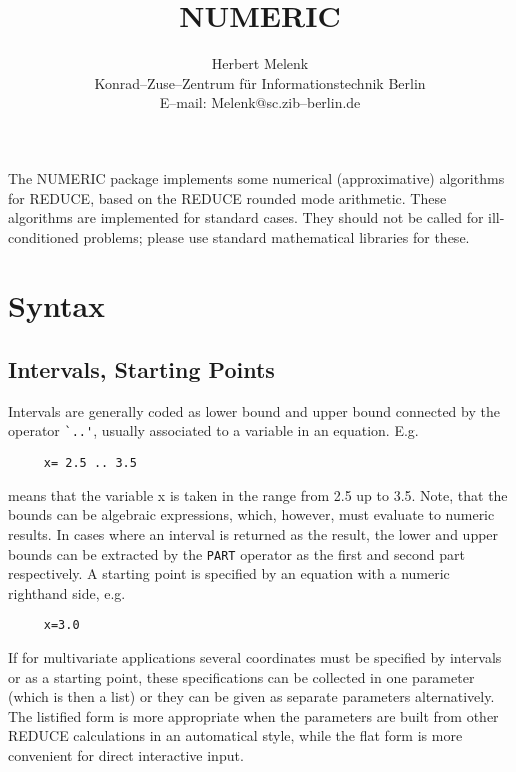 \date{}
\title{NUMERIC}
\author{Herbert Melenk \\ 
Konrad--Zuse--Zentrum f\"ur Informationstechnik Berlin \\
E--mail: Melenk@sc.zib--berlin.de}

\maketitle

The {\small NUMERIC} package implements some numerical (approximative)
algorithms for {\small REDUCE}, based on the {\small REDUCE} rounded mode 
arithmetic. These algorithms are implemented for standard cases.
They should not be called for ill-conditioned problems;
please use standard mathematical libraries for these.

\section{Syntax}

\subsection{Intervals, Starting Points}
 
Intervals are generally coded as lower bound and
upper bound connected by the operator \verb+`..'+, usually 
associated to a variable in an 
equation. E.g.

\begin{verbatim}
     x= 2.5 .. 3.5 
\end{verbatim}

means that the variable x is taken in the range from 2.5 up to
3.5. Note, that the bounds can be algebraic
expressions, which, however, must evaluate to numeric results.
In cases where an interval is returned as the result, the lower
and upper bounds can be extracted by the \verb+PART+ operator
as the first and second part respectively.
A starting point is specified by an equation with a numeric 
righthand side, e.g.
 
\begin{verbatim}
     x=3.0
\end{verbatim}
 
If for multivariate applications several coordinates must be
specified by intervals or as a starting point, these 
specifications can be collected in one parameter (which is then
a list) or they can be given as separate parameters
alternatively. The listified form is more appropriate when the
parameters are built from other REDUCE calculations in an
automatical style, while the flat form is more convenient
for direct interactive input.

